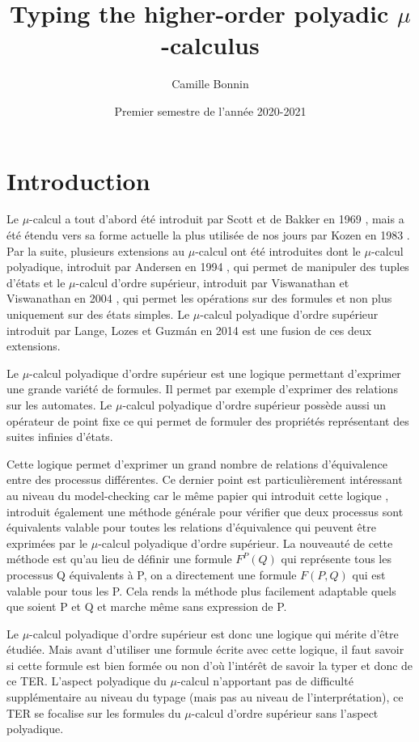 \documentclass{rapport}
\title{Typing the higher-order polyadic $\mu$-calculus}
\author{Camille Bonnin}
\date{Premier semestre de l'année 2020-2021}
\theoremstyle{plain}
\theoremstyle{remark}
\theoremstyle{definition}
\begin{document}
\maketitle

\tableofcontents
\newpage

\section{Introduction\label{intro}}

Le $\mu$-calcul a tout d'abord été introduit par Scott et de Bakker en 1969 \citep{scott1969theory}, mais a été étendu vers sa forme actuelle la plus utilisée de nos jours par Kozen en 1983 \citep{kozen1983results}. Par la suite, plusieurs extensions au 
$\mu$-calcul ont été introduites dont le $\mu$-calcul polyadique, introduit par Andersen en 1994 \citep{andersen1994polyadic}, qui permet de manipuler des tuples d'états et le $\mu$-calcul d'ordre supérieur, introduit par Viswanathan et Viswanathan en 2004 \citep{viswanathan2004higher}, qui permet les opérations sur des formules et non plus uniquement sur des états simples. Le $\mu$-calcul polyadique d'ordre supérieur introduit par Lange, Lozes et Guzm{\'a}n en 2014 \citep{lange2014model} est une fusion de ces deux extensions.

Le $\mu$-calcul polyadique d'ordre supérieur est une logique permettant d'exprimer une grande variété de formules. Il permet par exemple d'exprimer des relations sur les automates. Le $\mu$-calcul polyadique d'ordre supérieur possède aussi un opérateur de point fixe ce qui permet de formuler des propriétés représentant des suites infinies d'états. 

Cette logique permet d'exprimer un grand nombre de relations d'équivalence entre des processus différentes. Ce dernier point est particulièrement intéressant au niveau du model-checking car le même papier qui introduit cette logique \citep{lange2014model}, introduit également une méthode générale pour vérifier que deux processus sont équivalents valable pour toutes les relations d'équivalence qui peuvent être exprimées par le $\mu$-calcul polyadique d'ordre supérieur. La nouveauté de cette méthode est qu'au lieu de définir une formule $F^P(Q)$ qui représente tous les processus Q équivalents à P, on a directement une formule $F(P, Q)$ qui est valable pour tous les P. Cela rends la méthode plus facilement adaptable quels que soient P et Q et marche même sans expression de P. 

Le $\mu$-calcul polyadique d'ordre supérieur est donc une logique qui mérite d'être étudiée. Mais avant d'utiliser une formule écrite avec cette logique, il faut savoir si cette formule est bien formée ou non d'où l'intérêt de savoir la typer et donc de ce TER. L'aspect polyadique du $\mu$-calcul n'apportant pas de difficulté supplémentaire au niveau du typage (mais pas au niveau de l'interprétation), ce TER se focalise sur les formules du $\mu$-calcul d'ordre supérieur sans l'aspect polyadique. 
\end{document}
